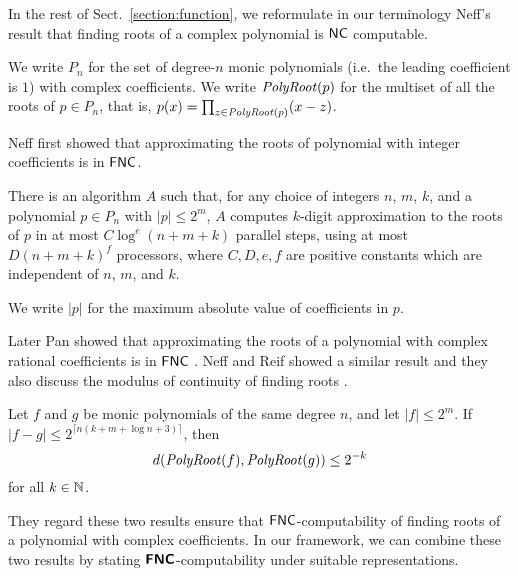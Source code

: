 \documentclass[envcountsame,orivec,oribibl]{llncs}
\begin{document}
In the rest of Sect.~\ref{section:function}, 
we reformulate in our terminology Neff's result that 
finding roots of a complex polynomial is $\mathsf{NC}$ computable. 

We write $P_n$ for the set of degree-$n$ monic 
polynomials (i.e.\ the leading coefficient is $1$) with complex coefficients.
We write $\mathit{PolyRoot}(p)$ for the multiset of all the roots of $p \in P_n$, that is, $p(x) = \prod_{z \in \mathit{PolyRoot}(p)} (x - z)$. 

Neff first showed that approximating the roots of polynomial
with integer coefficients is in $\mathsf{FNC}$.
\begin{theorem}
\label{theorem:neff1994}
There is an algorithm $A$ such that,
for any choice of integers $n$, $m$, $k$, and a polynomial $p \in P_n$
with $|p| \le 2^m$,
$A$ computes $k$-digit approximation to the roots of $p$ 
in at most $C \log^e(n + m + k)$ parallel steps, 
using at most $D(n + m + k)^f$ processors, where $C, D, e, f$ are positive
constants which are independent of $n$, $m$, and $k$.
\end{theorem}
We write $|p|$ for the maximum absolute value
 of coefficients in $p$.

Later Pan showed that approximating the roots of a polynomial
with complex rational coefficients is in $\mathsf{FNC}$ \cite{pan1995optimal}.
Neff and Reif showed a similar result and they also discuss
the modulus of continuity of finding roots \cite{neff1996efficient}.

\begin{theorem}
 Let $f$ and $g$ be monic polynomials of the same degree $n$,
 and let $|f| \le 2^m$.
 If $|f - g| \le 2^{\lceil n(k + m + \log n + 3)\rceil}$, then
 \begin{equation}
  d(\mathit{PolyRoot}(f), \mathit{PolyRoot}(g)) \le 2^{-k} 
 \end{equation}
 for all $k \in \mathbb N$.
\end{theorem}

They regard these two results ensure that $\mathsf{FNC}$-computability
of finding roots of a polynomial with complex coefficients.%
In our framework, we can combine these two results by stating 
$\text{\bfseries \sffamily \upshape FNC}$-computability under suitable representations.
\end{document}
